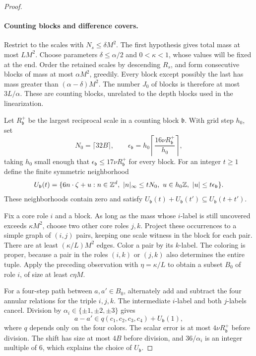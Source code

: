 \begin{proof}
\paragraph{Counting blocks and difference covers.}
Restrict to the scales with $N_s\leq\delta M^2$.  The first hypothesis
gives total mass at most $LM^2$.  Choose parameters
$\delta\leq\alpha/2$ and $0<\kappa<1$, whose values will be fixed at
the end.  Order the retained scales by descending $R_s$, and form
consecutive blocks of mass at most $\alpha M^2$, greedily.  Every
block except possibly the last has mass greater than
$(\alpha-\delta)M^2$.  The number $J_0$ of blocks is therefore at most
$3L/\alpha$.  These are counting blocks, unrelated to the depth
blocks used in the linearization.

Let $R_{\mathfrak b}^+$ be the largest reciprocal scale in a counting
block $\mathfrak b$.  With grid step $h_0$, set
\[
 N_0=\lceil32B\rceil,\qquad
 \epsilon_{\mathfrak b}
 =h_0\left\lceil\frac{16\nu R_{\mathfrak b}^+}{h_0}\right\rceil,
\]
taking $h_0$ small enough that
$\epsilon_{\mathfrak b}\leq17\nu R_{\mathfrak b}^+$ for every block.
For an integer $t\geq1$ define the finite symmetric neighborhood
\[
 U_{\mathfrak b}(t)=
 \{6n\cdot\zeta+u:
       n\in\mathbb Z^d,\ |n|_\infty\leq tN_0,
       \ u\in h_0\mathbb Z,\ |u|\leq t\epsilon_{\mathfrak b}\}.
\]
These neighborhoods contain zero and satisfy
$U_{\mathfrak b}(t)+U_{\mathfrak b}(t')
 \subseteq U_{\mathfrak b}(t+t')$.

Fix a core role $i$ and a block.  As long as the mass whose $i$-label
is still uncovered exceeds $\kappa M^2$, choose two other core roles
$j,k$.  Project these occurrences to a simple graph of $(i,j)$
pairs, keeping one scale witness in the block for each pair.  There
are at least $(\kappa/L)M^2$ edges.  Color a pair by its $k$-label.
The coloring is proper, because a pair in the roles $(i,k)$ or
$(j,k)$ also determines the entire tuple.  Apply the preceding
observation with $\eta=\kappa/L$ to obtain a subset $B_0$ of role
$i$, of size at least $c\eta M$.

For a four-step path between $a,a'\in B_0$, alternately add and
subtract the four annular relations for the triple $i,j,k$.
The intermediate $i$-label and both $j$-labels cancel.  Division by
$\alpha_i\in\{\pm1,\pm2,\pm3\}$ gives
\[
 a-a'\in q(c_1,c_2,c_3,c_4)+U_{\mathfrak b}(1),
\]
where $q$ depends only on the four colors.  The scalar error is at
most $4\nu R_{\mathfrak b}^+$ before division.  The shift has size
at most $4B$ before division, and $36/\alpha_i$ is an integer
multiple of $6$, which explains the choice of $U_{\mathfrak b}$.


\end{proof}
